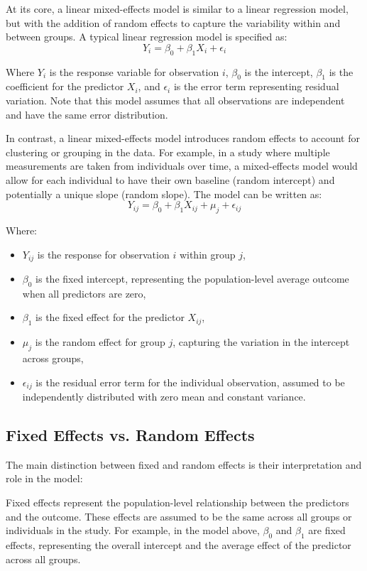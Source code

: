 At its core, a linear mixed-effects model is similar to a linear regression model, but with the addition of random effects to capture the variability within and between groups. A typical linear regression model is specified as:
\begin{equation}
Y_i=\beta_0+\beta_1X_i+\epsilon_i 
\end{equation}

Where $Y_i$ is the response variable for observation $i$, $\beta_0$  is the intercept, $\beta_1$ is the coefficient for the predictor $X_i$, and $\epsilon_i$ is the error term representing residual variation. Note that this model assumes that all observations are independent and have the same error distribution.

In contrast, a linear mixed-effects model introduces random effects to account for clustering or grouping in the data. For example, in a study where multiple measurements are taken from individuals over time, a mixed-effects model would allow for each individual to have their own baseline (random intercept) and potentially a unique slope (random slope). The model can be written as:
\begin{equation}
Y_{ij}=\beta_0+\beta_1X_{ij}+\mu_j+\epsilon_{ij} 
\end{equation}

\noindent Where:
\begin{itemize}
\item $Y_{ij}$ is the response for observation $i$ within group $j$,
\item $\beta_0$ is the fixed intercept, representing the population-level average outcome when all predictors are zero,
\item $\beta_1$ is the fixed effect for the predictor $X_{ij}$,
\item $\mu_j$ is the random effect for group $j$, capturing the variation in the intercept across groups,
\item $\epsilon_{ij}$ is the residual error term for the individual observation, assumed to be independently distributed with zero mean and constant variance.
\end{itemize}

\subsection*{Fixed Effects vs. Random Effects}
The main distinction between fixed and random effects is their interpretation and role in the model:

Fixed effects represent the population-level relationship between the predictors and the outcome. These effects are assumed to be the same across all groups or individuals in the study. For example, in the model above, $\beta_0$ and $\beta_1$ are fixed effects, representing the overall intercept and the average effect of the predictor across all groups.


